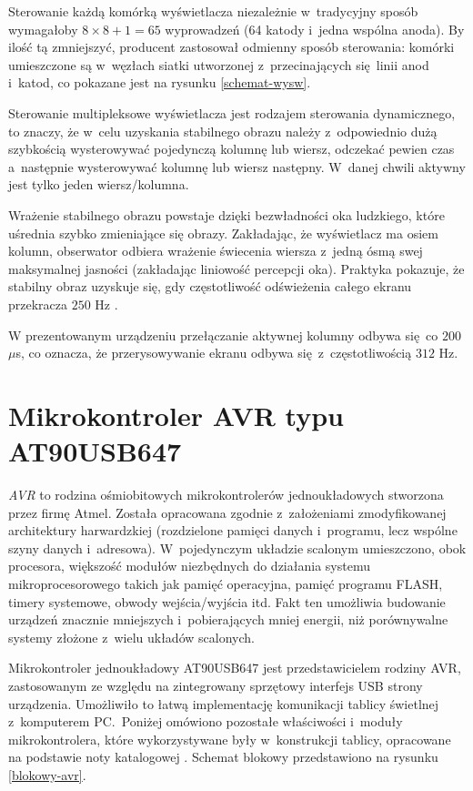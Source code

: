 Sterowanie każdą komórką wyświetlacza niezależnie w~tradycyjny sposób wymagałoby $ 8 \times 8 + 1 = 65 $ wyprowadzeń (64 katody i~jedna wspólna anoda). By ilość tą zmniejszyć, producent zastosował odmienny sposób sterowania: komórki umieszczone są w~węzłach siatki utworzonej z~przecinających się linii anod i~katod, co pokazane jest na rysunku \ref{schemat-wysw}.

Sterowanie multipleksowe wyświetlacza jest rodzajem sterowania dynamicznego, to znaczy, że w~celu uzyskania stabilnego obrazu należy z~odpowiednio dużą szybkością wysterowywać pojedynczą kolumnę lub wiersz, odczekać pewien czas a~następnie wysterowywać kolumnę lub wiersz następny. W~danej chwili aktywny jest tylko jeden wiersz/kolumna.

Wrażenie stabilnego obrazu powstaje dzięki bezwładności oka ludzkiego, które uśrednia szybko zmieniające się obrazy. Zakładając, że wyświetlacz ma osiem kolumn, obserwator odbiera wrażenie świecenia wiersza z~jedną ósmą swej maksymalnej jasności (zakładając liniowość percepcji oka). Praktyka pokazuje, że stabilny obraz uzyskuje się, gdy częstotliwość odświeżenia całego ekranu przekracza $250$ Hz \cite{sztuka2}.

W prezentowanym urządzeniu przełączanie aktywnej kolumny odbywa się co $200$ $\mu$s, co oznacza, że przerysowywanie ekranu odbywa się z~częstotliwością $312$ Hz.

\section{Mikrokontroler AVR typu AT90USB647}

\textit{AVR} to rodzina ośmiobitowych mikrokontrolerów jednoukładowych stworzona przez firmę Atmel. Została opracowana zgodnie z~założeniami zmodyfikowanej architektury harwardzkiej (rozdzielone pamięci danych i~programu, lecz wspólne szyny danych i~adresowa). W~pojedynczym układzie scalonym umieszczono, obok procesora, większość modułów niezbędnych do działania systemu mikroprocesorowego takich jak pamięć operacyjna, pamięć programu FLASH, timery systemowe, obwody wejścia/wyjścia itd. Fakt ten umożliwia budowanie urządzeń znacznie mniejszych i~pobierających mniej energii, niż porównywalne systemy złożone z~wielu układów scalonych.

Mikrokontroler jednoukładowy AT90USB647 jest przedstawicielem rodziny AVR, zastosowanym ze względu na zintegrowany sprzętowy interfejs USB strony urządzenia. Umożliwiło to łatwą implementację komunikacji tablicy świetlnej z~komputerem PC.~Poniżej omówiono pozostałe właściwości i~moduły mikrokontrolera, które wykorzystywane były w~konstrukcji tablicy, opracowane na podstawie noty katalogowej \cite{ds-avr}. Schemat blokowy przedstawiono na rysunku \ref{blokowy-avr}.

